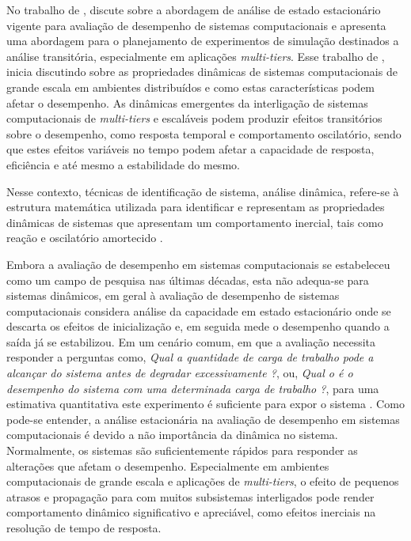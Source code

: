 No trabalho de , discute sobre a abordagem de análise de estado estacionário vigente para avaliação de desempenho de sistemas computacionais e apresenta uma abordagem para o planejamento de experimentos de simulação destinados a análise transitória, especialmente em aplicações \textit{multi-tiers}.
Esse trabalho de , inicia discutindo sobre as propriedades dinâmicas de sistemas computacionais de grande escala em ambientes distribuídos e como estas características podem afetar o desempenho. As dinâmicas emergentes da interligação de sistemas computacionais de \textit{multi-tiers} e escaláveis podem produzir efeitos transitórios sobre o desempenho, como resposta temporal e comportamento oscilatório, sendo que estes efeitos variáveis no tempo podem afetar a capacidade de resposta, eficiência e até mesmo a estabilidade do mesmo. 

\begin{citacao}
	Nesse contexto, técnicas de identificação de sistema, análise dinâmica, refere-se à estrutura matemática utilizada para identificar e representam as propriedades dinâmicas de sistemas que apresentam um comportamento inercial, tais como reação e oscilatório amortecido \cite{Lourenco2015}. 
\end{citacao}

Embora a avaliação de desempenho em sistemas computacionais se estabeleceu como um campo de pesquisa nas últimas décadas, esta não adequa-se para sistemas dinâmicos, em geral à avaliação de desempenho de sistemas computacionais considera análise da capacidade em estado estacionário onde se descarta os efeitos de inicialização e, em seguida mede o desempenho quando a saída já se estabilizou. Em um cenário comum, em que a avaliação necessita responder a perguntas como, \textit{Qual a quantidade de carga de trabalho pode a alcançar do sistema antes de degradar excessivamente ?}, ou, \textit{Qual o é o desempenho do sistema com uma determinada carga de trabalho ?}, para uma estimativa quantitativa este experimento é suficiente para expor o sistema \cite{Lourenco2015}.
Como pode-se entender, a análise estacionária na avaliação de desempenho em sistemas computacionais é devido a não importância da dinâmica no sistema. Normalmente, os sistemas são suficientemente rápidos para responder as alterações que afetam o desempenho. Especialmente em ambientes computacionais de grande escala e aplicações de \textit{multi-tiers}, o efeito de pequenos atrasos e propagação para com muitos subsistemas interligados pode render comportamento dinâmico significativo e apreciável, como efeitos inerciais na resolução de tempo de resposta.

